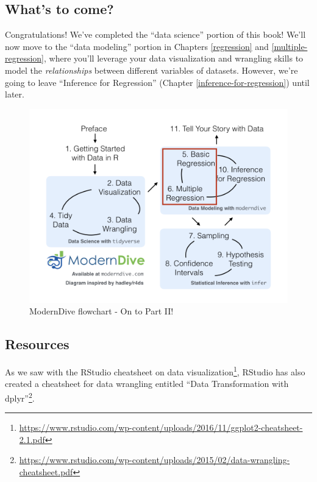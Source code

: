 \documentclass[12pt,]{krantz}
\renewcommand{\href}[2]{#2\footnote{\url{#1}}}
\theoremstyle{definition}
\theoremstyle{definition}
\theoremstyle{definition}
\theoremstyle{remark}
\begin{document}
\subsection{What's to come?}\label{whats-to-come-3}

Congratulations! We've completed the ``data science'' portion of this
book! We'll now move to the ``data modeling'' portion in Chapters
\ref{regression} and \ref{multiple-regression}, where you'll leverage
your data visualization and wrangling skills to model the
\emph{relationships} between different variables of datasets. However,
we're going to leave ``Inference for Regression'' (Chapter
\ref{inference-for-regression}) until later.

\begin{figure}

{\centering \includegraphics[width=\textwidth]{images/flowcharts/flowchart/flowchart.005} 

}

\caption{ModernDive flowchart - On to Part II!}\label{fig:unnamed-chunk-158}
\end{figure}

\subsection{Resources}\label{resources-1}

As we saw with the RStudio cheatsheet on
\href{https://www.rstudio.com/wp-content/uploads/2016/11/ggplot2-cheatsheet-2.1.pdf}{data
visualization}, RStudio has also created a cheatsheet for data wrangling
entitled
\href{https://www.rstudio.com/wp-content/uploads/2015/02/data-wrangling-cheatsheet.pdf}{``Data
Transformation with dplyr''}.
\end{document}

